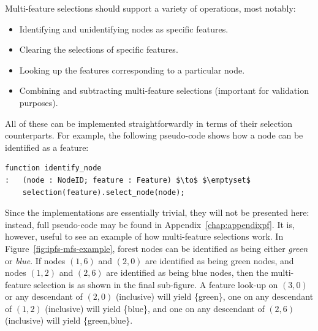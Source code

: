 \noindent Multi-feature selections should support a variety of operations, most notably:

\begin{itemize}
\item Identifying and unidentifying nodes as specific features.
\item Clearing the selections of specific features.
\item Looking up the features corresponding to a particular node.
\item Combining and subtracting multi-feature selections (important for validation purposes).
\end{itemize}

\newpage

\noindent All of these can be implemented straightforwardly in terms of their selection counterparts. For example, the following pseudo-code shows how a node can be identified as a feature:

\begin{lstlisting}[style=Default,backgroundcolor={\color[gray]{0.8}}]
function identify_node
:	(node : NodeID; feature : Feature) $\to$ $\emptyset$
	selection(feature).select_node(node);
\end{lstlisting}

\noindent Since the implementations are essentially trivial, they will not be presented here: instead, full pseudo-code may be found in Appendix~\ref{chap:appendixpf}. It is, however, useful to see an example of how multi-feature selections work. In Figure~\ref{fig:ipfs-mfs-example}, forest nodes can be identified as being either \emph{green} or \emph{blue}. If nodes $(1,6)$ and $(2,0)$ are identified as being green nodes, and nodes $(1,2)$ and $(2,6)$ are identified as being blue nodes, then the multi-feature selection is as shown in the final sub-figure. A feature look-up on $(3,0)$ or any descendant of $(2,0)$ (inclusive) will yield \{green\}, one on any descendant of $(1,2)$ (inclusive) will yield \{blue\}, and one on any descendant of $(2,6)$ (inclusive) will yield \{green,blue\}.

